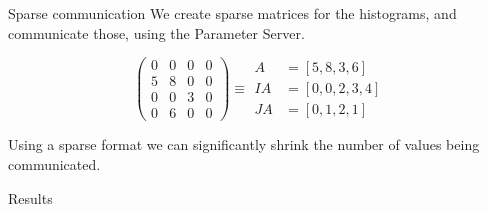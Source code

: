 \documentclass[final]{beamer}
\newlength{\onecolwid}
\begin{document}
\begin{frame}[t]
\begin{columns}[t]
\begin{column}{\onecolwid}
\begin{block}{Sparse communication}
		We create sparse matrices for the histograms, and communicate
		those, using the Parameter Server.
		
		\begin{equation*}
			\begin{pmatrix}
			0 & 0 & 0 & 0 \\
			5 & 8 & 0 & 0 \\
			0 & 0 & 3 & 0 \\
			0 & 6 & 0 & 0
			\end{pmatrix} \equiv 
			\begin{aligned}
			A &= [5, 8, 3, 6] \\
			IA &= [0, 0, 2, 3, 4] \\
			JA &= [0, 1, 2, 1]
			\end{aligned}
		\end{equation*}
		
		Using a sparse format we can significantly shrink the number of values being communicated.
	
	\end{block}
	
	\begin{block}{Results}


\end{block}
\end{column}
\end{columns}
\end{frame}
\end{document}

